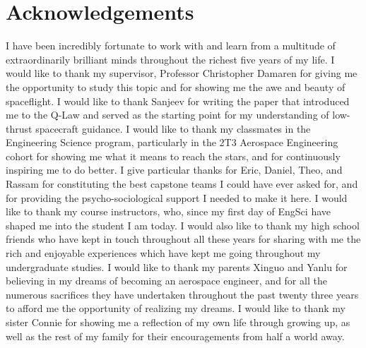 \section*{Acknowledgements}
I have been incredibly fortunate to work with and learn from a multitude of extraordinarily brilliant minds throughout the richest five years of my life. I would like to thank my supervisor, Professor Christopher Damaren for giving me the opportunity to study this topic and for showing me the awe and beauty of spaceflight. I would like to thank Sanjeev for writing the paper that introduced me to the Q-Law and served as the starting point for my understanding of low-thrust spacecraft guidance. I would like to thank my classmates in the Engineering Science program, particularly in the 2T3 Aerospace Engineering cohort for showing me what it means to reach the stars, and for continuously inspiring me to do better. I give particular thanks for Eric, Daniel, Theo, and Rassam for constituting the best capstone teams I could have ever asked for, and for providing the psycho-sociological support I needed to make it here. I would like to thank my course instructors, who, since my first day of EngSci have shaped me into the student I am today. I would also like to thank my high school friends who have kept in touch throughout all these years for sharing with me the rich and enjoyable experiences which have kept me going throughout my undergraduate studies. I would like to thank my parents Xinguo and Yanlu for believing in my dreams of becoming an aerospace engineer, and for all the numerous sacrifices they have undertaken throughout the past twenty three years to afford me the opportunity of realizing my dreams. I would like to thank my sister Connie for showing me a reflection of my own life through growing up, as well as the rest of my family for their encouragements from half a world away.



\vspace*{\fill}